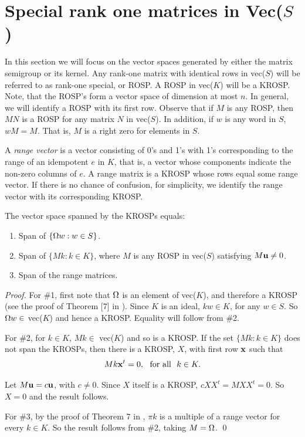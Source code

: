 


\section{Special rank one matrices in Vec($S$)}  %


In this section we will focus on the vector spaces generated by either the matrix semigroup or its kernel. 
Any rank-one matrix with identical rows in vec($S$) will be referred to as rank-one special, or ROSP.  
A ROSP in vec($K$) will be a KROSP.  
Note, that the ROSP’s form a vector space of dimension at most $n$.  
In general, we will identify a ROSP with its first row.  
Observe that if $M$ is any ROSP, then $MN$ is a ROSP for any matrix $N$ in vec($S$).
In addition, if $w$ is any word in $S$, $wM=M$.
That is, $M$ is a right zero for elements in $S$.


A \textit{range vector} is a vector consisting of 0's and 1's with 1's corresponding to the range of an idempotent $e$ in $K$, that is, a vector whose components indicate the non-zero columns of $e$. 
A range matrix is a KROSP whose rows equal some range vector.  
If there is no chance of confusion, for simplicity, we identify the range vector with its corresponding KROSP.


\begin{proposition}  \label{prop:5.2}
The vector space spanned by the KROSPs equals: 
\begin{enumerate}
\item[{\normalfont 1.}]  Span of $\{\Omega w: w \in S \}$.
\item[{\normalfont 2.}]  Span of  $\{Mk: k \in K\}$, where $M$ is any ROSP in vec($S$) satisfying  $M\mathbf u \not= 0$.
\item[{\normalfont 3.}]  Span of the range matrices.
\end{enumerate}
\end{proposition}


\begin{proof}    For \#1, first note that $\Omega$ is an element of vec($K$), and therefore a KROSP (see the proof of Theorem [7] in \cite{BM}).  Since $K$ is an ideal, $kw \in K$, for any  $w \in S$.  
So $\Omega w \in$ vec($K$) and hence a KROSP. 
Equality will follow from \#2.


For \#2, for  $k \in K$, $Mk \in$ vec($K$)  and so is a KROSP.   
If the set  $\{Mk : k \in K\}$ does not span the KROSPs, then there is a KROSP, $X$, with first row $\mathbf x$ such that 
\[
  Mk\mathbf x^t=0, \ \hbox{ for all } \ k \in K.
\]


Let  $M\mathbf u = c\mathbf u$, with  $c \not= 0$.  
Since $X$ itself is a KROSP, $cXX^t = MXX^t = 0$.  
So $X = 0$ and the result follows. 


For \#3, by the proof of Theorem 7 in \cite{BM}, $\pi k$ is a multiple of a range vector for every $k \in K$.  
So the result follows from \#2, taking  $M=\Omega$. 
\qed
\end{proof}


